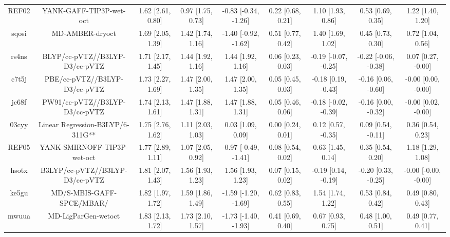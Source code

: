 \documentclass{article}
\begin{document}
\begin{center}
\begin{longtable}{|ccccccccc|}
 REF02 &                            YANK-GAFF-TIP3P-wet-oct &  1.62 [2.61, 0.80] &  0.97 [1.75, 0.73] &  -0.83 [-0.34, -1.26] &  0.22 [0.68, 0.21] &     1.10 [1.93, 0.86] &     0.53 [0.69, 0.35] &     1.22 [1.40, 1.20] \\
 sqosi &                                    MD-AMBER-dryoct &  1.69 [2.05, 1.39] &  1.42 [1.74, 1.16] &  -1.40 [-0.92, -1.62] &  0.51 [0.77, 0.42] &     1.40 [1.69, 1.02] &     0.45 [0.73, 0.30] &     0.72 [1.04, 0.56] \\
 rs4ns &                     BLYP/cc-pVTZ//B3LYP-D3/cc-pVTZ &  1.71 [2.17, 1.45] &  1.44 [1.92, 1.16] &     1.44 [1.92, 1.16] &  0.06 [0.23, 0.03] &  -0.19 [-0.07, -0.25] &  -0.22 [-0.06, -0.38] &    0.07 [0.27, -0.00] \\
 c7t5j &                      PBE/cc-pVTZ//B3LYP-D3/cc-pVTZ &  1.73 [2.27, 1.69] &  1.47 [2.00, 1.35] &     1.47 [2.00, 1.35] &  0.05 [0.45, 0.03] &   -0.18 [0.19, -0.43] &   -0.16 [0.06, -0.60] &   -0.00 [0.00, -0.00] \\
 jc68f &                     PW91/cc-pVTZ//B3LYP-D3/cc-pVTZ &  1.74 [2.13, 1.61] &  1.47 [1.88, 1.31] &     1.47 [1.88, 1.31] &  0.05 [0.46, 0.06] &  -0.18 [-0.02, -0.39] &   -0.16 [0.00, -0.32] &   -0.00 [0.02, -0.00] \\
 03cyy &                   Linear Regression-B3LYP/6-311G** &  1.75 [2.76, 1.62] &  1.11 [2.03, 1.03] &     0.03 [1.09, 0.09] &  0.00 [0.24, 0.01] &    0.12 [0.57, -0.35] &    0.09 [0.54, -0.11] &     0.36 [0.54, 0.23] \\
 REF05 &                        YANK-SMIRNOFF-TIP3P-wet-oct &  1.77 [2.89, 1.11] &  1.07 [2.05, 0.92] &  -0.97 [-0.49, -1.41] &  0.08 [0.54, 0.02] &     0.63 [1.45, 0.14] &     0.35 [0.54, 0.20] &     1.18 [1.29, 1.08] \\
 hsotx &                    B3LYP/cc-pVTZ//B3LYP-D3/cc-pVTZ &  1.81 [2.07, 1.43] &  1.56 [1.93, 1.23] &     1.56 [1.93, 1.23] &  0.07 [0.15, 0.02] &   -0.19 [0.14, -0.19] &   -0.20 [0.33, -0.25] &  -0.00 [-0.00, -0.00] \\
 ke5gu &                          MD/S-MBIS-GAFF-SPCE/MBAR/ &  1.82 [1.97, 1.72] &  1.59 [1.86, 1.49] &  -1.59 [-1.20, -1.69] &  0.62 [0.83, 0.55] &     1.54 [1.74, 1.22] &     0.53 [0.84, 0.42] &     0.49 [0.80, 0.43] \\
 mwuua &                                MD-LigParGen-wetoct &  1.83 [2.13, 1.72] &  1.73 [2.10, 1.57] &  -1.73 [-1.40, -1.93] &  0.41 [0.69, 0.40] &     0.67 [0.93, 0.75] &     0.48 [1.00, 0.51] &     0.49 [0.77, 0.41] \\

\end{longtable}
\end{center}
\end{document}
